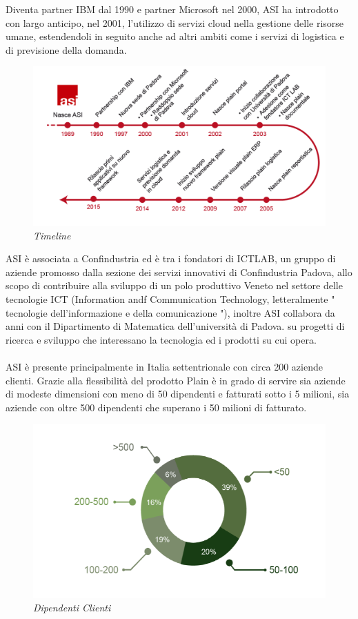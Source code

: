 Diventa partner IBM dal 1990 e partner Microsoft nel 2000, ASI ha introdotto con largo anticipo, nel 2001, l'utilizzo di servizi cloud nella gestione delle risorse umane, estendendoli in seguito anche ad altri ambiti come i servizi di logistica e di previsione della domanda.

\begin{figure}[ht]
	\centering
	\includegraphics[scale=0.25]{immagini/azienda/timeline}
	\caption{\textit{\textit{Timeline \asi}}}
\end{figure}\FloatBarrier

ASI è associata a Confindustria ed è tra i fondatori di ICTLAB, un gruppo di aziende promosso dalla sezione dei servizi innovativi di Confindustria Padova, allo scopo di contribuire alla sviluppo di un polo produttivo Veneto nel settore delle tecnologie ICT (Information andf Communication Technology, letteralmente " tecnologie dell'informazione e della comunicazione "), inoltre ASI collabora da anni con il Dipartimento di Matematica dell'università di Padova. su progetti di ricerca e sviluppo che interessano la tecnologia ed i prodotti su cui opera.
\\\\
ASI è presente principalmente in Italia settentrionale con circa 200 aziende clienti. Grazie alla flessibilità del prodotto Plain è in grado di servire sia aziende di modeste dimensioni con meno di 50 dipendenti e fatturati sotto i 5 milioni, sia aziende con oltre 500 dipendenti che superano i 50 milioni di fatturato.

\begin{figure}[ht]
	\centering
	\includegraphics[scale=0.35]{immagini/azienda/dipendenti_clienti}
	\caption{\textit{Dipendenti Clienti \asi}}
\end{figure}\FloatBarrier

